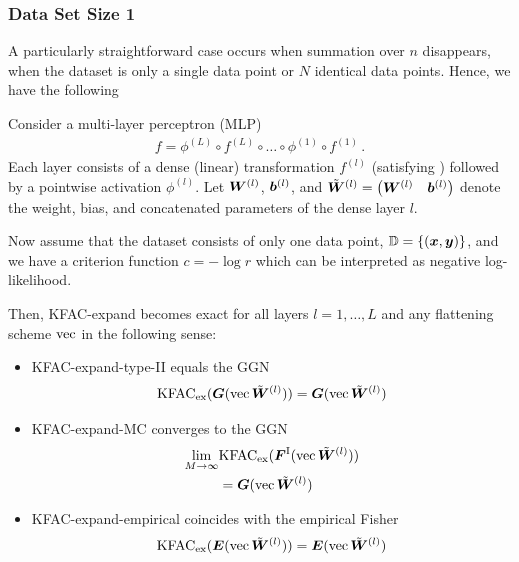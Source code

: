 \switchcolumn[1]
\switchcolumn[0]

\subsubsection{Data Set Size 1}
A particularly straightforward case occurs when summation over $n$ disappears, \ie when the dataset is only a single data point or $N$ identical data points.
Hence, we have the following

\begin{test}\label{test:kfac_expand_linear_no_weight_sharing_batch_size_1}
  Consider a multi-layer perceptron (MLP)
  \begin{align*}
    f = \phi^{(L)} \circ f^{(L)} \circ \ldots \circ \phi^{(1)} \circ f^{(1)}\,.
  \end{align*}
  Each layer consists of a dense (linear) transformation $f^{(l)}$ (satisfying ) followed by a pointwise activation $\phi^{(l)}$.
  Let $\mW^{(l)}$, $\vb^{(l)}$, and $\tilde{\mW}^{(l)} = \begin{pmatrix} \mW^{(l)} & \vb^{(l)} \end{pmatrix}$ denote the weight, bias, and concatenated parameters of the dense layer $l$.

  Now assume that the dataset consists of only one data point, $\sD = \{ (\vx, \vy) \}$, and we have a criterion function $c = - \log r$ which can be interpreted as negative log-likelihood.

  Then, KFAC-expand becomes exact for all layers $l = 1, \dots, L$ and any flattening scheme $\vec$ in the following sense:
  \begin{itemize}[leftmargin=0.5cm]
  \item KFAC-expand-type-II equals the GGN
    \begin{align*}
      \kfac_{\text{ex}}(\mG(\vec \tilde{\mW}^{(l)})) = \mG(\vec \tilde{\mW}^{(l)})
    \end{align*}
  \item KFAC-expand-MC converges to the GGN
    \begin{align*}
      \lim_{M \to \infty} &\kfac_{\text{ex}}(\mF^{\text{I}}(\vec\tilde{\mW}^{(l)}))
      \\
                          &= \mG(\vec \tilde{\mW}^{(l)})
    \end{align*}
  \item KFAC-expand-empirical coincides with the empirical Fisher
    \begin{align*}
      \kfac_{\text{ex}}(\mE(\vec\tilde{\mW}^{(l)})) = \mE(\vec \tilde{\mW}^{(l)})
    \end{align*}
  \end{itemize}
\end{test}

